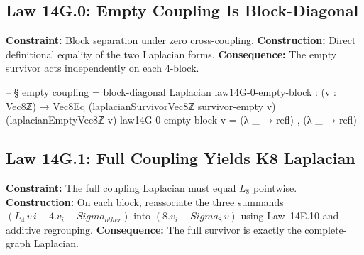 \documentclass[11pt,a4paper]{book}
\def\Sigma{Sigma}%
\def\cdot{.}%
\def\text#1{#1}%
\def\texorpdfstring#1#2{#2}%
\begin{document}
\subsection{Law 14G.0: Empty Coupling Is Block-Diagonal}

\textbf{Constraint:} Block separation under zero cross-coupling.
\textbf{Construction:} Direct definitional equality of the two Laplacian forms.
\textbf{Consequence:} The empty survivor acts independently on each 4-block.

\begin{code}
-- § empty coupling = block-diagonal Laplacian
law14G-0-empty-block : (v : Vec8ℤ) → Vec8Eq (laplacianSurvivorVec8ℤ survivor-empty v) (laplacianEmptyVec8ℤ v)
law14G-0-empty-block v = (λ _ → refl) , (λ _ → refl)
\end{code}

\subsection{Law 14G.1: Full Coupling Yields K\texorpdfstring{$_8$}{8} Laplacian}

\textbf{Constraint:} The full coupling Laplacian must equal $L_8$ pointwise.
\textbf{Construction:} On each block, reassociate the three summands
$(L_4\,v\,i + 4 \cdot v_i - \Sigma_{\text{other}})$ into
$(8 \cdot v_i - \Sigma_8\,v)$ using Law~14E.10 and additive regrouping.
\textbf{Consequence:} The full survivor is exactly the complete-graph Laplacian.
\end{document}
